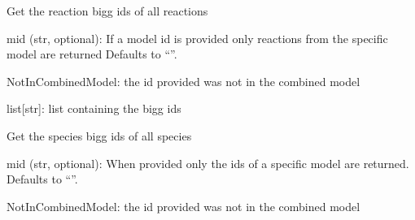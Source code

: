 \documentclass[letterpaper,10pt,english]{sphinxmanual}
\begin{document}
\begin{fulllineitems}

\begin{fulllineitems}
\label{\detokenize{8_API/endPointFBA:endPointFBA.CommunityModel.CommunityModel.get_reaction_bigg_ids}}
\pysigstartsignatures
{}
\pysigstopsignatures
\sphinxAtStartPar
Get the reaction bigg ids of all reactions
\begin{description}
\sphinxAtStartPar
mid (str, optional): If a model id is provided only reactions from
the specific model are returned
Defaults to “”.

\sphinxAtStartPar
NotInCombinedModel: the id provided was not in the combined model

\sphinxAtStartPar
list{[}str{]}: list containing the bigg ids

\end{description}

\end{fulllineitems}


\begin{fulllineitems}
\label{\detokenize{8_API/endPointFBA:endPointFBA.CommunityModel.CommunityModel.get_species_bigg_ids}}
\pysigstartsignatures
{}
\pysigstopsignatures
\sphinxAtStartPar
Get the species bigg ids of all species
\begin{description}
\sphinxAtStartPar
mid (str, optional): When provided only the ids of a specific
model are returned.
Defaults to “”.

\sphinxAtStartPar
NotInCombinedModel: the id provided was not in the combined model


\end{description}
\end{fulllineitems}
\end{fulllineitems}
\end{document}
